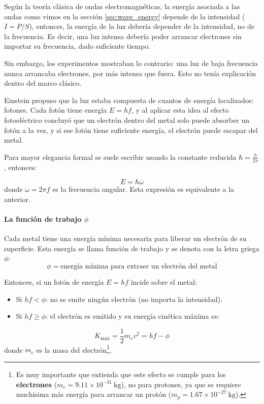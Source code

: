 Según la teoría clásica de ondas electromagnéticas, la energía asociada a las ondas como vimos en la sección \ref{sec:wave_energy} depende de la intensidad (\(I=P/S\)), entonces, la energía de la luz debería depender de la intensidad, no de la frecuencia. Es decir, una luz intensa debería poder arrancar electrones sin importar su frecuencia, dado suficiente tiempo.

Sin embargo, los experimentos mostraban lo contrario: una luz de baja frecuencia nunca arrancaba electrones, por más intensa que fuera. Esto no tenía explicación dentro del marco clásico.

Einstein propuso que la luz estaba compuesta de cuantos de energía localizados: fotones. Cada fotón tiene energía \(E = h f\), y al aplicar esta idea al efecto fotoeléctrico concluyó que un electrón dentro del metal solo puede absorber un fotón a la vez, y si ese fotón tiene suficiente energía, el electrón puede escapar del metal.

Para mayor elegancia formal se suele escribir usando la constante reducida \(\hbar = \frac{h}{2\pi}\), entonces:

\begin{equation*}
  E = \hbar \omega
\end{equation*}
donde \(\omega = 2\pi f\) es la frecuencia angular. Esta expresión es equivalente a la anterior.

\paragraph{La función de trabajo \(\phi\)}

Cada metal tiene una energía mínima necesaria para liberar un electrón de su superficie. Esta energía se llama función de trabajo y se denota con la letra griega \(\phi\):
\begin{equation*}
  \boxed{
    \phi = \text{energía mínima para extraer un electrón del metal}
  }
\end{equation*}

Entonces, si un fotón de energía \(E = h f\) incide sobre el metal:

\begin{itemize}
  \item Si \(h f < \phi\): no se emite ningún electrón (no importa la intensidad).
  \item Si \(h f \geq \phi\): el electrón es emitido y su energía cinética máxima es:
\end{itemize}

\begin{equation*}
  K_{\text{máx}} = \frac{1}{2} m_{e} v^2 = h f - \phi
\end{equation*}
donde \(m_e\) es la masa del electrón\footnote{Es muy importante que entienda que este efecto se cumple para los \textbf{electrones} (\(m_e = 9.11 \times 10^{-31} \ \text{kg}\)), no para protones, ya que se requiere muchisima más energía para arrancar un protón (\(m_p = 1.67 \times 10^{-27} \ \text{kg}\)).}. 

